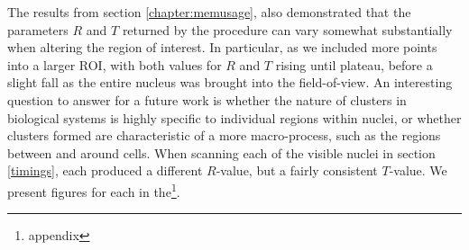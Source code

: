 \documentclass[11pt]{article}
\begin{document}
The results from section \ref{chapter:memusage}, also demonstrated that the parameters $R$ and $T$ returned by the procedure can vary somewhat substantially when altering the region of interest. In particular, as we included more points into a larger ROI, with both values for $R$ and $T$ rising until plateau, before a slight fall as the entire nucleus was brought into the field-of-view. An interesting question to answer for a future work is whether the nature of clusters in biological systems is highly specific to individual regions within nuclei, or whether clusters formed are characteristic of a more macro-process, such as the regions between and around cells. When scanning each of the visible nuclei in section \ref{timings}, each produced a different $R$-value, but a fairly consistent $T$-value. We present figures for each in the\footnote{appendix}.


\begin{figure}[t!]
	\centering
	\qquad
	\caption{}%
	\label{1unredclusters}
\end{figure}
\end{document}
